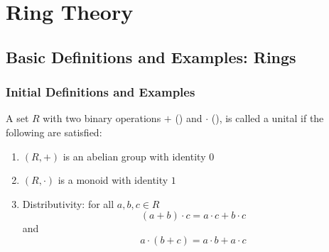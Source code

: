 \documentclass[12pt, a4paper, oneside, openright, titlepage]{book}
\begin{document}
\part{Ring Theory}


\chapter{\textsection\textsection Basic Definitions and Examples: Rings}

\section{\textsection Initial Definitions and Examples}



\begin{defn}
    A set $R$ with two binary operations $+$ () and $\cdot$ (), is called a unital  if the following are satisfied:
    \begin{enumerate}
        \item $(R,+)$ is an abelian group with identity $0$
        \item $(R,\cdot)$ is a monoid with identity $1$
        \item Distributivity: for all $a,b,c \in R$ $$(a + b)\cdot c = a\cdot c + b\cdot c$$
        and $$a\cdot (b+c) = a\cdot b + a\cdot c$$
    \end{enumerate}
\end{defn}
\end{document}
